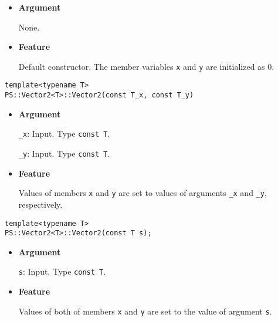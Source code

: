 \begin{itemize}

\item{{\bf Argument}}

None.

\item{{\bf Feature}}

Default constructor. The member variables \texttt{x} and \texttt{y} are initialized as 0.

\end{itemize}

\begin{screen}
\begin{verbatim}
template<typename T>
PS::Vector2<T>::Vector2(const T_x, const T_y)
\end{verbatim}
\end{screen}

\begin{itemize}

\item{{\bf Argument}}

\texttt{\_x}: Input. Type \texttt{const T}.

\texttt{\_y}: Input. Type \texttt{const T}.

\item{{\bf Feature}}

Values of members \texttt{x} and \texttt{y} are set to values of arguments \texttt{\_x} and \texttt{\_y}, respectively.

\end{itemize}

\begin{screen}
\begin{verbatim}
template<typename T>
PS::Vector2<T>::Vector2(const T s);
\end{verbatim}
\end{screen}

\begin{itemize}

\item{{\bf Argument}}

\texttt{s}: Input. Type \texttt{const T}.

\item{{\bf Feature}}

Values of both of members \texttt{x} and \texttt{y} are set to the value of argument \texttt{s}.

\end{itemize}

